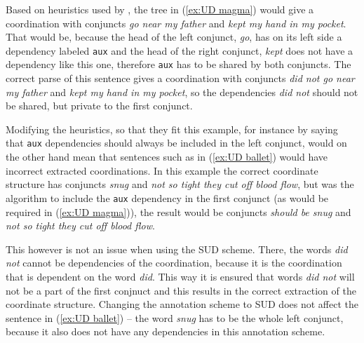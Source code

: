 Based on heuristics used by \cite{pbg2023}, the tree in (\ref{ex:UD magma}) would give a coordination with conjuncts \textsl{go near my father} and \textsl{kept my hand in my pocket}. That would be, because the head of the left conjunct, \textsl{go}, has on its left side a dependency labeled \texttt{aux} and the head of the right conjunct, \textsl{kept} does not have a dependency like this one, therefore \texttt{aux} has to be shared by both conjuncts. The correct parse of this sentence gives a coordination with conjuncts \textsl{did not go near my father} and \textsl{kept my hand in my pocket}, so the dependencies \textsl{did not} should not be shared, but private to the first conjunct. 

Modifying the heuristics, so that they fit this example, for instance by saying that \texttt{aux} dependencies should always be included in the left conjunct, would on the other hand mean that sentences such as in (\ref{ex:UD ballet}) would have incorrect extracted coordinations. In this example the correct coordinate structure has conjuncts \textsl{snug} and \textsl{not so tight they cut off blood flow}, but was the algorithm to include the \texttt{aux} dependency in the first conjunct (as would be required in (\ref{ex:UD magma})), the result would be conjuncts \textsl{should be snug} and \textsl{not so tight they cut off blood flow}.

This however is not an issue when using the SUD scheme. There, the words \textsl{did not} cannot be dependencies of the coordination, because it is the coordination that is dependent on the word \textsl{did}. This way it is ensured that words \textsl{did not} will not be a part of the first conjnuct and this results in the correct extraction of the coordinate structure. Changing the annotation scheme to SUD does not affect the sentence in (\ref{ex:UD ballet}) -- the word \textsl{snug} has to be the whole left conjunct, because it also does not have any dependencies in this annotation scheme.


